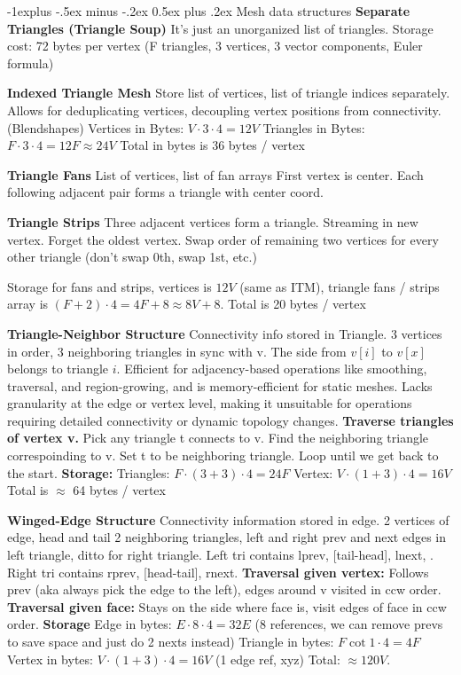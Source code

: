\documentclass[letterpaper, 8pt]{extarticle}
\makeatletter
\renewcommand{\subsection}{\@startsection{subsection}{2}{0mm}%
                                {-1explus -.5ex minus -.2ex}%
                                {0.5ex plus .2ex}%
                                {\normalfont\tiny\bfseries}}
\makeatother
\begin{document}
\begin{multicols*}{4}
    \subsection{Mesh data structures}
    \textbf{Separate Triangles (Triangle Soup)}
    It's just an unorganized list of triangles.
    Storage cost: 72 bytes per vertex
    (F triangles, 3 vertices, 3 vector components, Euler formula)

    \textbf{Indexed Triangle Mesh}
    Store list of vertices, list of triangle indices separately.
    Allows for deduplicating vertices, decoupling vertex positions from connectivity. (Blendshapes)
    Vertices in Bytes: $V \cdot 3 \cdot 4 = 12 V$
    Triangles in Bytes: $F \cdot 3 \cdot 4 = 12 F \approx 24 V$
    Total in bytes is 36 bytes / vertex

    \textbf{Triangle Fans}
    List of vertices, list of fan arrays
    First vertex is center. Each following adjacent pair forms a triangle with center coord.

    \textbf{Triangle Strips}
    Three adjacent vertices form a triangle.
    Streaming in new vertex.
    Forget the oldest vertex.
    Swap order of remaining two vertices for every other triangle (don't swap 0th, swap 1st, etc.)

    Storage for fans and strips, vertices is $12 V$ (same as ITM),
    triangle fans / strips array is $(F + 2) \cdot 4 = 4F + 8 \approx 8V + 8$.
    Total is 20 bytes / vertex

    \textbf{Triangle-Neighbor Structure}
    Connectivity info stored in Triangle.
    3 vertices in order, 3 neighboring triangles in sync with v.
    The side from $v[i]$ to $v[x]$ belongs to triangle $i$.
    Efficient for adjacency-based operations like smoothing, traversal, and region-growing,
    and is memory-efficient for static meshes.
    Lacks granularity at the edge or vertex level,
    making it unsuitable for operations requiring detailed connectivity or dynamic topology changes.
    \textbf{Traverse triangles of vertex v.}
    Pick any triangle t connects to v.
    Find the neighboring triangle correspoinding to v.
    Set t to be neighboring triangle.
    Loop until we get back to the start.
    \textbf{Storage:}
    Triangles: $F \cdot (3 + 3) \cdot 4 = 24F$
    Vertex: $V \cdot (1 + 3) \cdot 4 = 16V$
    Total is $\approx$ 64 bytes / vertex

    \textbf{Winged-Edge Structure}
    Connectivity information stored in edge.
    2 vertices of edge, head and tail
    2 neighboring triangles, left and right
    prev and next edges in left triangle,
    ditto for right triangle.
    Left tri contains lprev, [tail-head], lnext, .
    Right tri contains rprev, [head-tail], rnext.
    \textbf{Traversal given vertex:}
    Follows prev (aka always pick the edge to the left),
    edges around v visited in ccw order.
    \textbf{Traversal given face:}
    Stays on the side where face is,
    visit edges of face in ccw order.
    \textbf{Storage}
    Edge in bytes: $E \cdot 8 \cdot 4 = 32E$ (8 references, we can remove prevs to save space and just do 2 nexts instead)
    Triangle in bytes: $F \cot 1 \cdot 4 = 4F$
    Vertex in bytes: $V \cdot (1 + 3) \cdot 4 = 16V$ (1 edge ref, xyz)
    Total: $\approx 120V$.


\end{multicols*}
\end{document}
